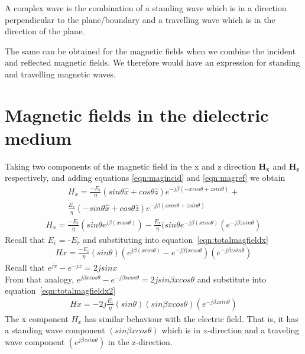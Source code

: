 A complex wave is the combination of a standing wave which is in a direction perpendicular to the plane/boundary and a travelling wave which is in the direction of the plane.

The same can be obtained for the magnetic fields when we combine the incident and reflected magnetic fields. We therefore
would have an expression for standing and travelling magnetic waves.

\section{Magnetic fields in the dielectric medium}
Taking two components of the magnetic field in the x and z direction
$\boldsymbol{H_x}$ and $\boldsymbol{H_z}$ respectively, and adding equations \ref{eqn:magincid} and \ref{eqn:magref} we obtain
\begin{align*}
H_x = \frac{-E_i}{\eta} (sin\theta \hat{x} + cos\theta \hat{z}) e^{-j\beta( -xcos\theta + zsin\theta)} +\\ 
\frac{E_r}{\eta} \left(-sin\theta \hat{x} + cos\theta \hat{z}\right) e^{-j\beta( xcos\theta + zsin\theta)}
\end{align*}
\begin{align}
H_x = \frac{-E_i}{\eta}(sin\theta e^{j\beta( xcos\theta)} ) - \frac{E_r}{\eta}(sin\theta e^{-j\beta( xcos\theta)} (e^{-j\beta zsin\theta})
\label{eqn:totalmagfieldx}
\end{align}
Recall that $E_i$ = -$E_r$ and substituting into equation~\ref{eqn:totalmagfieldx}
\begin{align}
Hx = \frac{-E_i}{\eta}(sin\theta)( e^{j\beta( xcos\theta)} - e^{-j\beta( xcos\theta}) (e^{-j\beta zsin\theta})
\label{eqn:totalmagfieldx2}
\end{align}
Recall that $e^{jx} - e^{-jx} = 2jsinx$ \\
From that analogy, $e^{j\beta xcos\theta} - e^{-j\beta xcos\theta} = 2jsin\beta xcos\theta$ and substitute into
equation~\eqref{eqn:totalmagfieldx2}
\begin{align}
Hx =  -2j \frac{E_i}{\eta}(sin\theta)( sin\beta xcos\theta) (e^{-j\beta zsin\theta})
\end{align} 
The x component $H_x$ has similar behaviour with the electric field. That is, it has a standing wave component $(sin\beta xcos\theta)$ which is in x-direction and a traveling wave component $(e^{j\beta zsin\theta})$ in the z-direction.

